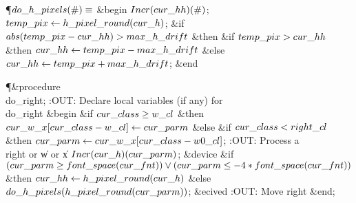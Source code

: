 \Y\P\D {}$\\{do\_h\_pixels}(\#)\S$\6
\&{begin} $\\{Incr}(\\{cur\_hh})(\#)$;\5
$\\{temp\_pix}\K\\{h\_pixel\_round}(\\{cur\_h})$;\6
\&{if} $\\{abs}(\\{temp\_pix}-\\{cur\_hh})>\\{max\_h\_drift}$ \1\&{then}\6
\&{if} $\\{temp\_pix}>\\{cur\_hh}$ \1\&{then}\5
$\\{cur\_hh}\K\\{temp\_pix}-\\{max\_h\_drift}$\6
\4\&{else} $\\{cur\_hh}\K\\{temp\_pix}+\\{max\_h\_drift}$;\2\2\6
\&{end}\par
\Y\P\4\&{procedure}\1\  \\{do\_right};\6
:OUT: Declare local variables (if any) for \\{do\_right}\X\2\6
\&{begin} \&{if} $\\{cur\_class}\G\\{w\_cl}$ \1\&{then}\5
$\\{cur\_w\_x}[\\{cur\_class}-\\{w\_cl}]\K\\{cur\_parm}$\6
\4\&{else} \&{if} $\\{cur\_class}<\\{right\_cl}$ \1\&{then}\5
$\\{cur\_parm}\K\\{cur\_w\_x}[\\{cur\_class}-\\{w0\_cl}]$;\2\2\6
:OUT: Process a \\{right} or \|w or \|x\X\6
$\\{Incr}(\\{cur\_h})(\\{cur\_parm})$;\6
\&{device} \&{if} $(\\{cur\_parm}\G\\{font\_space}(\\{cur\_fnt}))\V(\\{cur%
\_parm}\L-4\ast\\{font\_space}(\\{cur\_fnt}))$ \1\&{then}\5
$\\{cur\_hh}\K\\{h\_pixel\_round}(\\{cur\_h})$\6
\4\&{else} $\\{do\_h\_pixels}(\\{h\_pixel\_round}(\\{cur\_parm}))$;\2\6
\&{ecived}\6
:OUT: Move right\X\6
\&{end};\par
\fi

